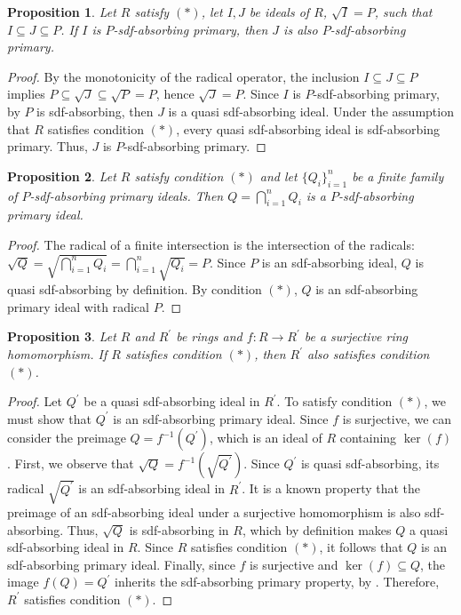 \documentclass{amsart}%
\newtheorem{proposition}{Proposition}[section]
\begin{document}
\begin{proposition}
\label{P2} Let $R$ satisfy $(\ast)$, let $I,J$ be ideals of $R$, $\sqrt{I}=P$,
such that $I\subseteq J\subseteq P$. If $I$ is $P$-sdf-absorbing primary, then
$J$ is also $P$-sdf-absorbing primary.
\end{proposition}

\begin{proof}
By the monotonicity of the radical operator, the inclusion $I\subseteq
J\subseteq P$ implies $P\subseteq\sqrt{J}\subseteq\sqrt{P}=P$, hence $\sqrt
{J}=P$. Since $I$ is $P$-sdf-absorbing primary, by \cite[Theorem
1]{KhashanCelikel} $P$ is sdf-absorbing, then $J$ is a quasi sdf-absorbing
ideal. Under the assumption that $R$ satisfies condition $(\ast)$, every quasi
sdf-absorbing ideal is sdf-absorbing primary. Thus, $J$ is $P$-sdf-absorbing primary.
\end{proof}

\begin{proposition}
Let $R$ satisfy condition $(\ast)$ and let $\{Q_{i}\}_{i=1}^{n}$ be a finite
family of $P$-sdf-absorbing primary ideals. Then $Q=\bigcap_{i=1}^{n}Q_{i}$ is
a $P$-sdf-absorbing primary ideal.
\end{proposition}

\begin{proof}
The radical of a finite intersection is the intersection of the radicals:
$\sqrt{Q}=\sqrt{\bigcap_{i=1}^{n}Q_{i}}=\bigcap_{i=1}^{n}\sqrt{Q_{i}}=P.$
Since $P$ is an sdf-absorbing ideal, $Q$ is quasi sdf-absorbing by definition.
By condition $(\ast)$, $Q$ is an sdf-absorbing primary ideal with radical $P$.
\end{proof}

\begin{proposition}
Let $R$ and $R^{\prime}$ be rings and $f:R\rightarrow R^{\prime}$ be a
surjective ring homomorphism. If $R$ satisfies condition $(\ast)$, then
$R^{\prime}$ also satisfies condition $(\ast)$.
\end{proposition}

\begin{proof}
Let $Q^{\prime}$ be a quasi sdf-absorbing ideal in $R^{\prime}$. To satisfy
condition $(\ast)$, we must show that $Q^{\prime}$ is an sdf-absorbing primary
ideal. Since $f$ is surjective, we can consider the preimage $Q=f^{-1}%
(Q^{\prime})$, which is an ideal of $R$ containing $\ker(f)$. First, we
observe that $\sqrt{Q}=f^{-1}(\sqrt{Q^{\prime}})$. Since $Q^{\prime}$ is quasi
sdf-absorbing, its radical $\sqrt{Q^{\prime}}$ is an sdf-absorbing ideal in
$R^{\prime}$. It is a known property that the preimage of an sdf-absorbing
ideal under a surjective homomorphism is also sdf-absorbing. Thus, $\sqrt{Q}$
is sdf-absorbing in $R$, which by definition makes $Q$ a quasi sdf-absorbing
ideal in $R$. Since $R$ satisfies condition $(\ast)$, it follows that $Q$ is
an sdf-absorbing primary ideal. Finally, since $f$ is surjective and
$\ker(f)\subseteq Q$, the image $f(Q)=Q^{\prime}$ inherits the sdf-absorbing
primary property, by \cite[Proposition 4 (2)]{KhashanCelikel}. Therefore,
$R^{\prime}$ satisfies condition $(\ast)$.
\end{proof}
\end{document}
